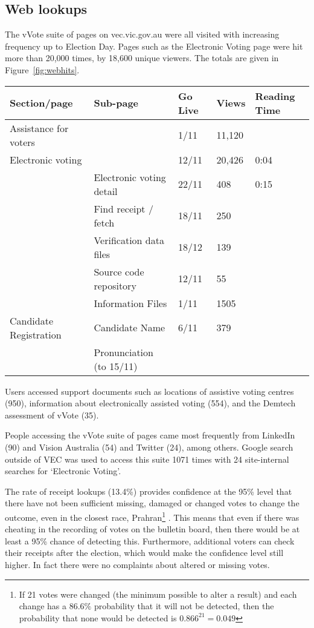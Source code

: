 \documentclass[twocolumn]{article}
\begin{document}
\subsection*{Web lookups}

The vVote suite of pages on vec.vic.gov.au were all visited with increasing frequency up to Election Day.  Pages such as the Electronic Voting page were hit more than 20,000 times, by 18,600 unique viewers.   The totals are given in Figure~\ref{fig:webhits}.
\begin{figure*}
\begin{center}
\begin{tabular}{lllll}
Section/page &	Sub-page	& Go Live	& Views	& Reading Time \\ \hline
Assistance for voters	 &&	1/11	& 11,120	\\ \hline
Electronic voting &&		12/11 &	20,426 &	0:04 \\ 
&	Electronic voting detail	& 22/11	& 408	& 0:15 \\
&	Find receipt / fetch	& 18/11	& 250	\\
&	Verification data files &	18/12 &	139	\\
&	Source code repository &	12/11 &	55	\\
&	Information Files &	1/11	& 1505	\\ \hline
Candidate Registration	& Candidate Name  &	6/11 & 	379	\\
& Pronunciation (to 15/11) 
\end{tabular}
\end{center}
\caption{VEC Electronic Voting web page hits: November 2014 -- January 2015}
\label{fig:webhits}
\end{figure*}



Users accessed support documents such as locations of assistive voting centres (950),  information about electronically assisted voting (554), and the Demtech assessment of vVote (35).  

People accessing the vVote suite of pages came most frequently from LinkedIn (90) and Vision Australia (54) and Twitter (24), among others.  Google search outside of VEC was used to access this suite 1071 times with 24 site-internal searches for `Electronic Voting'.

The rate of receipt lookups (13.4\%) provides confidence at the 95\% level that there have not been sufficient missing, damaged or changed votes to change the outcome, even in the closest race, Prahran\footnote{If 21 votes were changed (the minimum possible to alter a result) and each change has a $86.6\%$ probability that it will not be detected, then the probability that none would be detected is $0.866^{21} = 0.049$} .  This means that even if there was cheating in the recording of votes on the bulletin board, then there would be at least a 95\% chance of detecting this.  Furthermore, additional voters can check their receipts after the election, which would make the confidence level still higher.  In fact there were no complaints about altered or missing votes.    
\end{document}
